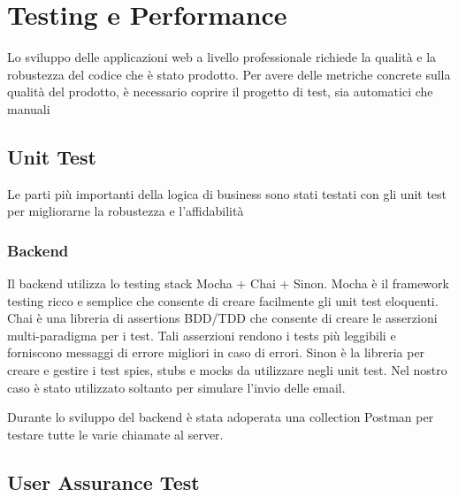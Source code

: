 

\chapter{Testing e Performance}

Lo sviluppo delle applicazioni web a livello professionale richiede la qualità e la robustezza del codice che è stato prodotto. Per avere delle metriche concrete sulla qualità
del prodotto, è necessario coprire il progetto di test, sia automatici che manuali

\section{Unit Test}
Le parti più importanti della logica di business sono stati testati con gli unit test per migliorarne la robustezza e l'affidabilità
 \subsection{Backend}
 Il backend utilizza lo testing stack Mocha + Chai + Sinon. 
Mocha è il framework testing ricco e semplice che consente di creare facilmente
gli unit test eloquenti.
Chai è una libreria di assertions BDD/TDD che consente di creare le asserzioni
multi-paradigma per i test. Tali asserzioni rendono i tests più leggibili e forniscono messaggi di errore migliori in caso di errori. 
Sinon è la libreria per creare e gestire i test spies, stubs e mocks da utilizzare
negli unit test. Nel nostro caso è stato utilizzato soltanto per simulare l'invio delle email.

Durante lo sviluppo del backend è stata adoperata una collection Postman per testare tutte le varie chiamate al server. 

\section{User Assurance Test}